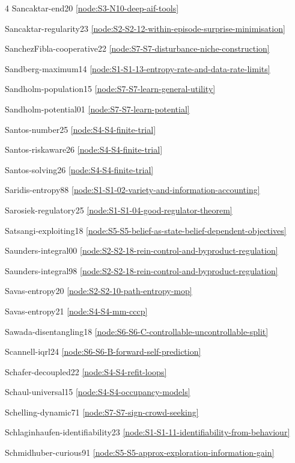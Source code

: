 \documentclass[10pt]{article}
\begin{document}
{\begin{multicols}{4}
Sancaktar-end20 \hfill \ref{node:S3-N10-deep-aif-tools}\par
Sancaktar-regularity23 \hfill \ref{node:S2-S2-12-within-episode-surprise-minimisation}\par
SanchezFibla-cooperative22 \hfill \ref{node:S7-S7-disturbance-niche-construction}\par
Sandberg-maximum14 \hfill \ref{node:S1-S1-13-entropy-rate-and-data-rate-limits}\par
Sandholm-population15 \hfill \ref{node:S7-S7-learn-general-utility}\par
Sandholm-potential01 \hfill \ref{node:S7-S7-learn-potential}\par
Santos-number25 \hfill \ref{node:S4-S4-finite-trial}\par
Santos-riskaware26 \hfill \ref{node:S4-S4-finite-trial}\par
Santos-solving26 \hfill \ref{node:S4-S4-finite-trial}\par
Saridis-entropy88 \hfill \ref{node:S1-S1-02-variety-and-information-accounting}\par
Sarosiek-regulatory25 \hfill \ref{node:S1-S1-04-good-regulator-theorem}\par
Satsangi-exploiting18 \hfill \ref{node:S5-S5-belief-as-state-belief-dependent-objectives}\par
Saunders-integral00 \hfill \ref{node:S2-S2-18-rein-control-and-byproduct-regulation}\par
Saunders-integral98 \hfill \ref{node:S2-S2-18-rein-control-and-byproduct-regulation}\par
Savas-entropy20 \hfill \ref{node:S2-S2-10-path-entropy-mop}\par
Savas-entropy21 \hfill \ref{node:S4-S4-mm-cccp}\par
Sawada-disentangling18 \hfill \ref{node:S6-S6-C-controllable-uncontrollable-split}\par
Scannell-iqrl24 \hfill \ref{node:S6-S6-B-forward-self-prediction}\par
Schafer-decoupled22 \hfill \ref{node:S4-S4-refit-loops}\par
Schaul-universal15 \hfill \ref{node:S4-S4-occupancy-models}\par
Schelling-dynamic71 \hfill \ref{node:S7-S7-sign-crowd-seeking}\par
Schlaginhaufen-identifiability23 \hfill \ref{node:S1-S1-11-identifiability-from-behaviour}\par
Schmidhuber-curious91 \hfill \ref{node:S5-S5-approx-exploration-information-gain}\par

\end{multicols}}
\end{document}
